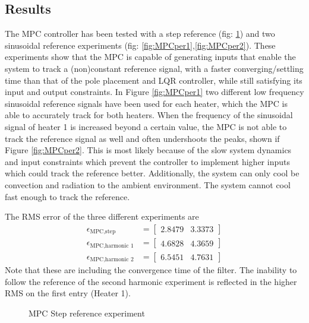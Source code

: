 \newpage
\subsection{Results}
The MPC controller has been tested with a step reference (fig: \ref{fig:MPCstep}) and two sinusoidal reference experiments (fig: \ref{fig:MPCper1},\ref{fig:MPCper2}). These experiments show that the MPC is capable of generating inputs that enable the system to track a (non)constant reference signal, with a faster converging/settling time than that of the pole placement and LQR controller, while still satisfying its input and output constraints. In Figure \ref{fig:MPCper1} two different low frequency sinusoidal reference signals have been used for each heater, which the MPC is able to accurately track for both heaters. When the frequency of the sinusoidal signal of heater 1 is increased beyond a certain value, the MPC is not able to track the reference signal as well and often undershoots the peaks, shown if Figure \ref{fig:MPCper2}. This is most likely because of the slow system dynamics and input constraints which prevent the controller to implement higher inputs which could track the reference better. Additionally, the system can only cool be convection and radiation to the ambient environment. The system cannot cool fast enough to track the reference.

The RMS error of the three different experiments are
\begin{align*}
    \epsilon_{\text{MPC,step}} &= \begin{bmatrix} 2.8479 & 3.3373\end{bmatrix}\\
    \epsilon_{\text{MPC,harmonic 1}} &= \begin{bmatrix} 4.6828 & 4.3659 \end{bmatrix}\\
    \epsilon_{\text{MPC,harmonic 2}} &= \begin{bmatrix} 6.5451 & 4.7631\end{bmatrix}
\end{align*}
Note that these are including the convergence time of the filter. The inability to follow the reference of the second harmonic experiment is reflected in the higher RMS on the first entry (Heater 1).

\begin{figure}[ht]
    \centering
    
    \caption{MPC Step reference experiment}
    \label{fig:MPCstep}
\end{figure}


